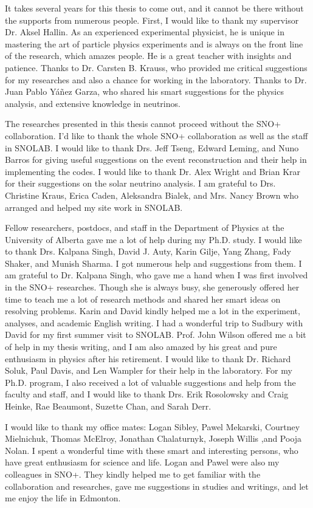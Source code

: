 It takes several years for this thesis to come out, and it cannot be there without the supports from numerous people. First, I would like to thank my supervisor Dr. Aksel Hallin. As an experienced experimental physicist, he is unique in mastering the art of particle physics experiments and is always on the front line of the research, which amazes people. He is a great teacher with insights and patience. Thanks to Dr. Carsten B. Krauss, who provided me critical suggestions for my researches and also a chance for working in the laboratory. Thanks to Dr. Juan Pablo Y\'{a}\~{n}ez Garza, who shared his smart suggestions for the physics analysis, and extensive knowledge in neutrinos. 

The researches presented in this thesis cannot proceed without the SNO+ collaboration. I'd like to thank the whole SNO+ collaboration as well as the staff in SNOLAB. I would like to thank Drs. Jeff Tseng, Edward Leming, and Nuno Barros for giving useful suggestions on the event reconstruction and their help in implementing the codes. I would like to thank Dr. Alex Wright and Brian Krar for their suggestions on the solar neutrino analysis. I am grateful to Drs. Christine Kraus, Erica Caden, Aleksandra Bialek, and Mrs. Nancy Brown who arranged and helped my site work in SNOLAB.

Fellow researchers, postdocs, and staff in the Department of Physics at the University of Alberta gave me a lot of help during my Ph.D. study. I would like to thank Drs. Kalpana Singh, David J. Auty, Karin Gilje, Yang Zhang, Fady Shaker, and Munish Sharma. I got numerous help and suggestions from them. I am grateful to Dr. Kalpana Singh, who gave me a hand when I was first involved in the SNO+ researches. Though she is always busy, she generously offered her time to teach me a lot of research methods and shared her smart ideas on resolving problems. Karin and David kindly helped me a lot in the experiment, analyses, and academic English writing. I had a wonderful trip to Sudbury with David for my first summer visit to SNOLAB. Prof. John Wilson offered me a bit of help in my thesis writing, and I am also amazed by his great and pure enthusiasm in physics after his retirement. I would like to thank Dr. Richard Soluk, Paul Davis, and Len Wampler for their help in the laboratory. For my Ph.D. program, I also received a lot of valuable suggestions and help from the faculty and staff, and I would like to thank Drs. Erik Rosolowsky and Craig Heinke, Rae Beaumont, Suzette Chan, and Sarah Derr.

I would like to thank my office mates: Logan Sibley, Pawel Mekarski, Courtney Mielnichuk, Thomas McElroy, Jonathan Chalaturnyk, Joseph Willis ,and Pooja Nolan. I spent a wonderful time with these smart and interesting persons, who have great enthusiasm for science and life. Logan and Pawel were also my colleagues in SNO+. They kindly helped me to get familiar with the collaboration and researches, gave me suggestions in studies and writings, and let me enjoy the life in Edmonton.

